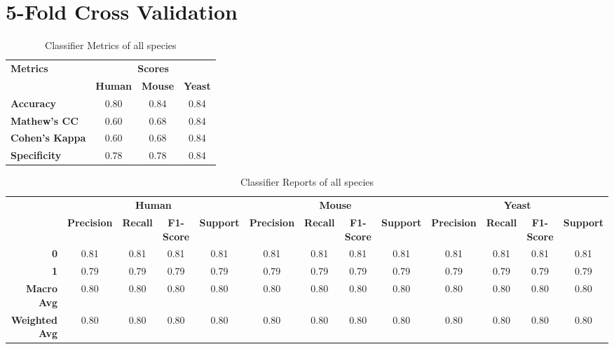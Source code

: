 \documentclass{article}
\begin{document}
\pagestyle{empty}
\section{5-Fold Cross Validation}
\vspace{20pt}

\begin{table}[h!tbp]
  \centering
  \renewcommand{\arraystretch}{1.2}
  \begin{tabular}{lccc}
    \toprule
    \multirow{2}{*}{\textbf{Metrics}} & \multicolumn{3}{c}{\textbf{Scores}} \\
    \cmidrule(lr){2-4}
    & \textbf{Human}& \textbf{Mouse} & \textbf{Yeast} \\
    \midrule
    \textbf{Accuracy} & 0.80& 0.84 & 0.84 \\
    \textbf{Mathew's CC} & 0.60& 0.68 & 0.84 \\
    \textbf{Cohen's Kappa} & 0.60& 0.68 & 0.84 \\
    \textbf{Specificity} & 0.78& 0.78 & 0.84 \\
    \bottomrule
  \end{tabular}
  \caption{Classifier Metrics of all species}
\end{table}

\begin{table}[h!tbp]
    \centering
    \renewcommand{\arraystretch}{1.2}
    \begin{tabular}{r|cccc|cccc|cccc|}

      \multicolumn{1}{c}{}
      & \multicolumn{4}{c}{\textbf{Human}}
      & \multicolumn{4}{c}{\textbf{Mouse}}
      & \multicolumn{4}{c}{\textbf{Yeast}} \\

      \cline{2-13}
      & \textbf{Precision} & \textbf{Recall} & \textbf{F1-Score} & \textbf{Support} 
      & \textbf{Precision} & \textbf{Recall} & \textbf{F1-Score} & \textbf{Support}
      & \textbf{Precision} & \textbf{Recall} & \textbf{F1-Score} & \textbf{Support} \\
      \cline{2-13}
      \textbf{0} & 0.81 & 0.81 & 0.81 & 0.81
                 & 0.81 & 0.81 & 0.81 & 0.81
                 & 0.81 & 0.81 & 0.81 & 0.81 \\

      \textbf{1} & 0.79 & 0.79 & 0.79 & 0.79
                 & 0.79 & 0.79 & 0.79 & 0.79
                 & 0.79 & 0.79 & 0.79 & 0.79 \\
      \textbf{Macro Avg} & 0.80 & 0.80 & 0.80 & 0.80 
                         & 0.80 & 0.80 & 0.80 & 0.80 
                         & 0.80 & 0.80 & 0.80 & 0.80 \\
      \textbf{Weighted Avg} & 0.80 & 0.80 & 0.80 & 0.80
                            & 0.80 & 0.80 & 0.80 & 0.80
                            & 0.80 & 0.80 & 0.80 & 0.80 \\
      \cline{2-13}
    \end{tabular}
    \caption{Classifier Reports of all species}
  \end{table}
\end{document}
